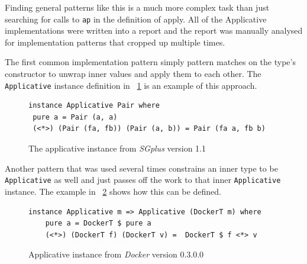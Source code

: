 Finding general patterns like this is a much more complex task than just searching for calls to \texttt{ap} in the definition of apply. All of the Applicative implementations were written into a report and the report was manually analysed for implementation patterns that cropped up multiple times. 

The first common implementation pattern simply pattern matches on the type's constructor to unwrap inner values and apply them to each other. The \texttt{Applicative} instance definition in \DIFdelbegin {}\DIFdelend \DIFaddbegin {}\DIFaddend ~\ref{sgplusPair} is an example of this approach. 

\begin{figure}[t]
\begin{lstlisting}
instance Applicative Pair where
 pure a = Pair (a, a)
 (<*>) (Pair (fa, fb)) (Pair (a, b)) = Pair (fa a, fb b)
\end{lstlisting}
\caption{The applicative instance from \textit{SGplus} version 1.1}
\label{sgplusPair}
\end{figure}

Another pattern that was used several times constrains an inner type to be \texttt{Applicative} as well and just passes off the work to that inner \texttt{Applicative} instance. The example in \DIFdelbegin {}\DIFdelend \DIFaddbegin {}\DIFaddend ~\ref{dockerApp} shows how this can be defined.

\begin{figure}[t]
\begin{lstlisting}
instance Applicative m => Applicative (DockerT m) where
    pure a = DockerT $ pure a
    (<*>) (DockerT f) (DockerT v) =  DockerT $ f <*> v
\end{lstlisting}
\caption{Applicative instance from \textit{Docker} version 0.3.0.0}
\label{dockerApp}
\end{figure}

\DIFaddbegin \subsection{}

\texttt{} 

